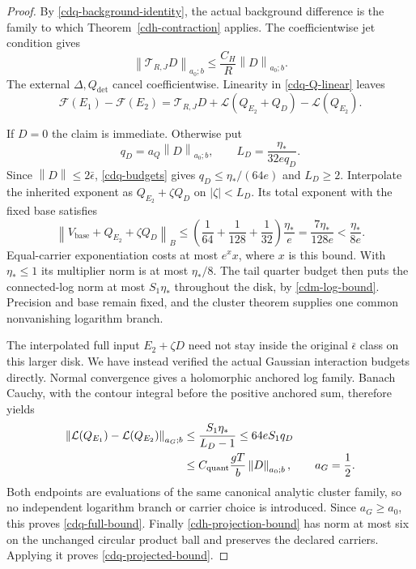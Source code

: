 \documentclass[11pt]{article}
\theoremstyle{remark}
\newcommand{\norm}[1]{\left\|#1\right\|}
\begin{document}
\begin{proof}
By \eqref{cdq-background-identity}, the actual background
difference is the family to which
Theorem~\ref{cdh-contraction} applies. The coefficientwise
jet condition gives
\begin{equation}
 \norm{\mathcal T_{R,J}D}_{a_0;b}
                  \le\frac{C_H}{R}\norm{D}_{a_0;b}.
 \label{cdq-background-bound}
\end{equation}
The external $\Delta,Q_{\det}$ cancel coefficientwise.
Linearity in \eqref{cdq-Q-linear} leaves
\[
 \mathscr F(E_1)-\mathscr F(E_2)
   =\mathcal T_{R,J}D
       +\mathcal L(Q_{E_2}+Q_D)-\mathcal L(Q_{E_2}).
\]

If $D=0$ the claim is immediate. Otherwise put
\begin{equation}
 q_D=a_Q\norm{D}_{a_0;b},\qquad
 L_D=\frac{\eta_*}{32e q_D}.
 \label{cdq-interpolation-radius}
\end{equation}
Since $\norm{D}\le2\bar\epsilon$,
\eqref{cdq-budgets} gives $q_D\le\eta_*/(64e)$ and
$L_D\ge2$. Interpolate the inherited exponent as
$Q_{E_2}+\zeta Q_D$ on $|\zeta|<L_D$. Its total exponent
with the fixed base satisfies
\begin{equation}
 \norm{V_{\mathrm{base}}+Q_{E_2}+\zeta Q_D}_B
 \le
 \left(\frac1{64}+\frac1{128}+\frac1{32}\right)
              \frac{\eta_*}{e}
 =\frac{7\eta_*}{128e}<\frac{\eta_*}{8e}.
 \label{cdq-exponent-budget}
\end{equation}
Equal-carrier exponentiation costs at most $e^xx$, where
$x$ is this bound. With $\eta_*\le1$ its multiplier norm
is at most $\eta_*/8$. The tail quarter budget then puts
the connected-log norm at most $S_1\eta_*$ throughout the
disk, by \eqref{cdm-log-bound}. Precision and base remain
fixed, and the cluster theorem supplies one common
nonvanishing logarithm branch.

The interpolated full input $E_2+\zeta D$ need not stay
inside the original $\bar\epsilon$ class on this larger
disk. We have instead verified the actual Gaussian
interaction budgets directly. Normal convergence gives
a holomorphic anchored log family. Banach Cauchy, with
the contour integral before the positive anchored sum,
therefore yields
\begin{align}
 \norm{\mathcal L(Q_{E_1})-\mathcal L(Q_{E_2})}_{a_G;b}
 &\le\frac{S_1\eta_*}{L_D-1}
 \le64eS_1q_D\notag\\
 &\le C_{\mathrm{quant}}\frac{gT}{b}\norm{D}_{a_0;b},
 \qquad a_G=\frac12.
 \label{cdq-log-bound}
\end{align}
Both endpoints are evaluations of the same canonical
analytic cluster family, so no independent logarithm
branch or carrier choice is introduced. Since
$a_G\ge a_0$, this proves \eqref{cdq-full-bound}.
Finally \eqref{cdh-projection-bound} has norm at most
six on the unchanged circular product ball and preserves
the declared carriers. Applying it proves
\eqref{cdq-projected-bound}.
\end{proof}
\end{document}
